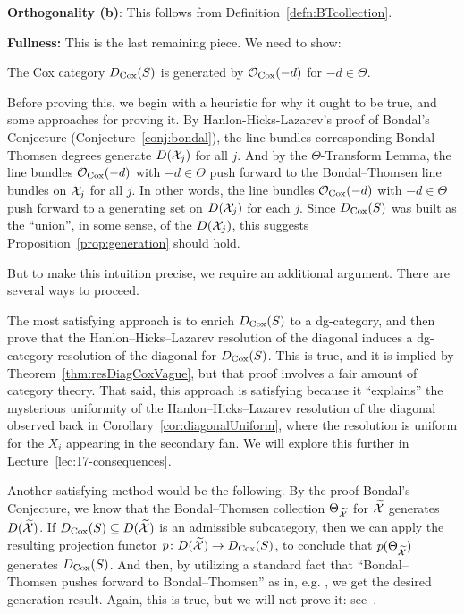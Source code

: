 \documentclass{amsart}
\begin{document}
{\bf Orthogonality (b)}: This follows from Definition~\ref{defn:BTcollection}.

{\bf Fullness:}  This is the last remaining piece.  We need to show:

\begin{prop}\label{prop:generation}
    The Cox category $D_{\operatorname{Cox}}(S)$ is generated by ${\mathcal O}_{\operatorname{Cox}}(-d)$ for $-d \in \Theta$.
\end{prop}

Before proving this, we begin with a heuristic for why it ought to be true, and some approaches for proving it. 
By Hanlon-Hicks-Lazarev's proof of Bondal's Conjecture (Conjecture~\ref{conj:bondal}), the line bundles corresponding Bondal--Thomsen degrees generate $D(\mathcal X_j)$ for all $j$.  And by the $\Theta$-Transform Lemma, the line bundles ${\mathcal O}_{\operatorname{Cox}}(-d)$ with $-d\in \Theta$ push forward to the Bondal--Thomsen line bundles on $\mathcal X_j$ for all $j$.  In other words, the line bundles  ${\mathcal O}_{\operatorname{Cox}}(-d)$ with $-d\in \Theta$  push forward to a generating set on $D(\mathcal X_j)$ for each $j$.  Since $D_{\operatorname{Cox}}(S)$ was built as the ``union'', in some sense, of the $D(\mathcal X_j)$, this suggests Proposition~\ref{prop:generation} should hold. 

But to make this intuition precise, we require an additional argument.  There are several ways to proceed.

The most satisfying approach is to enrich $D_{\operatorname{Cox}}(S)$ to a dg-category, and then prove that the Hanlon--Hicks--Lazarev resolution of the diagonal induces a dg-category resolution of the diagonal for $D_{\operatorname{Cox}}(S)$.  This is true, and it is implied by Theorem~\ref{thm:resDiagCoxVague}, but that proof involves a fair amount of category theory.  That said, this approach is satisfying because it ``explains'' the mysterious uniformity of the Hanlon--Hicks--Lazarev resolution of the diagonal observed back in Corollary~\ref{cor:diagonalUniform}, where the resolution is uniform for the $X_i$ appearing in the secondary fan. We will explore this further in Lecture~\ref{lec:17-consequences}. 

Another satisfying method would be the following.  By the proof Bondal's Conjecture, we know that the Bondal--Thomsen collection $\Theta_{\widetilde{\mathcal X}}$ for $\widetilde{\mathcal X}$ generates $D(\widetilde{\mathcal X})$.
If $D_{\operatorname{Cox}}(S)\subseteq D(\widetilde{\mathcal X})$ is an admissible subcategory, then we can apply the resulting projection functor $p\colon  D(\widetilde{\mathcal X}) \to D_{\operatorname{Cox}}(S)$, to conclude that $p(\Theta_{\widetilde{\mathcal X}})$ generates $D_{\operatorname{Cox}}(S)$.  And then, by utilizing a standard fact that ``Bondal--Thomsen pushes forward to Bondal--Thomsen'' as in, e.g. \cite[Proposition 2.28]{BBB+24}, we get the desired generation result.  Again, this is true, but we will not prove it: see~\cite[Corollary 5.5]{BBB+24}.
\end{document}
